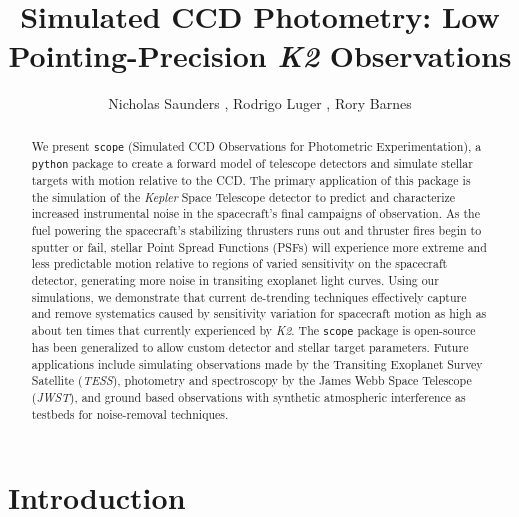 \documentclass[12pt,preprint]{aastex}
\begin{document}
\title{Simulated CCD Photometry: Low Pointing-Precision \textit{K2} Observations}

\author{Nicholas Saunders , Rodrigo Luger , Rory Barnes }


\begin{abstract}

	We present \texttt{scope} (Simulated CCD Observations for Photometric Experimentation), a \texttt{python} package to create a forward model of telescope detectors and simulate stellar targets with motion relative to the CCD. The primary application of this package is the simulation of the \textit{Kepler} Space Telescope detector to predict and characterize increased instrumental noise in the spacecraft's final campaigns of observation. As the fuel powering the spacecraft's stabilizing thrusters runs out and thruster fires begin to sputter or fail, stellar Point Spread Functions (PSFs) will experience more extreme and less predictable motion relative to regions of varied sensitivity on the spacecraft detector, generating more noise in transiting exoplanet light curves. Using our simulations, we demonstrate that current de-trending techniques  effectively capture and remove systematics caused by sensitivity variation for spacecraft motion as high as about ten times that currently experienced by \textit{K2}. The \texttt{scope} package is open-source has been generalized to allow custom detector and stellar target parameters. Future applications include simulating observations made by the Transiting Exoplanet Survey Satellite (\textit{TESS}), photometry and spectroscopy by the James Webb Space Telescope (\textit{JWST}), and ground based observations with synthetic atmospheric interference as testbeds for noise-removal techniques.

\end{abstract}

\section{Introduction}
\label{sec:intro}
\end{document}
